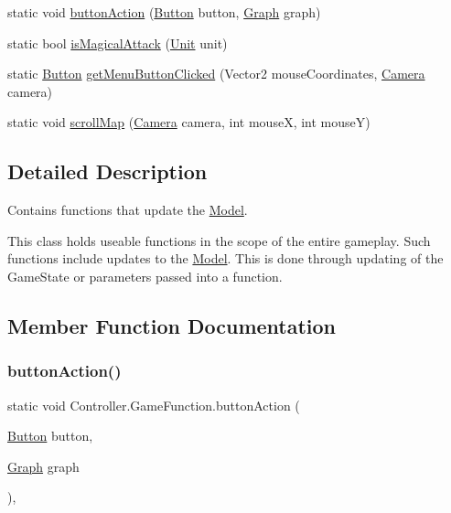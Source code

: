 \begin{DoxyCompactItemize}
static void \hyperlink{class_controller_1_1_game_function_a1510910fe1fc1d946712da7f72ee7da1}{button\+Action} (\hyperlink{class_model_1_1_button}{Button} button, \hyperlink{class_model_1_1_map_module_1_1_graph}{Graph} graph)
\item 
static bool \hyperlink{class_controller_1_1_game_function_a4f53c0a0edffecda9dea3fc3cd22b43e}{is\+Magical\+Attack} (\hyperlink{interface_model_1_1_unit_module_1_1_unit}{Unit} unit)
\item 
static \hyperlink{class_model_1_1_button}{Button} \hyperlink{class_controller_1_1_game_function_ae76737ddf87cf0ca533ac317da7c5ef3}{get\+Menu\+Button\+Clicked} (Vector2 mouse\+Coordinates, \hyperlink{class_view_1_1_camera}{Camera} camera)
\item 
static void \hyperlink{class_controller_1_1_game_function_a96148c53d564690b5cd207281fc5c0ef}{scroll\+Map} (\hyperlink{class_view_1_1_camera}{Camera} camera, int mouseX, int mouseY)
\end{DoxyCompactItemize}


\subsection{Detailed Description}
Contains functions that update the \hyperlink{namespace_model}{Model}. 

This class holds useable functions in the scope of the entire gameplay. Such functions include updates to the \hyperlink{namespace_model}{Model}. This is done through updating of the Game\+State or parameters passed into a function. 

\subsection{Member Function Documentation}
\hypertarget{class_controller_1_1_game_function_a1510910fe1fc1d946712da7f72ee7da1}{}\label{class_controller_1_1_game_function_a1510910fe1fc1d946712da7f72ee7da1} 
\subsubsection{\texorpdfstring{button\+Action()}{buttonAction()}}
{\footnotesize\ttfamily static void Controller.\+Game\+Function.\+button\+Action (\begin{DoxyParamCaption}\item[{\hyperlink{class_model_1_1_button}{Button}}]{button,  }\item[{\hyperlink{class_model_1_1_map_module_1_1_graph}{Graph}}]{graph }\end{DoxyParamCaption})\hspace{0.3cm}{\ttfamily [inline]}, {\ttfamily [static]}}

